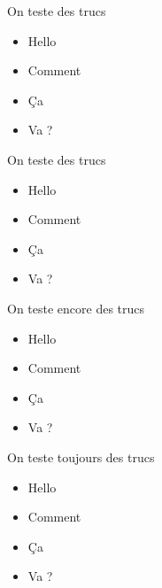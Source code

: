 \label{thermique}

\begin{frame}{On teste des trucs}
  \begin{itemize}
    \item<1->Hello
    \item<2->Comment
    \item<3->Ça
    \item<4->Va ?
  \end{itemize}
\end{frame}
\begin{frame}{On teste des trucs}
  \begin{itemize}
    \item<1->Hello
    \item<2->Comment
    \item<3->Ça
    \item<4->Va ?
  \end{itemize}
\end{frame}

\begin{frame}{On teste encore des trucs}
  \begin{itemize}
    \item<1->Hello
    \item<2->Comment
    \item<3->Ça
    \item<4->Va ?
  \end{itemize}
\end{frame}

\begin{frame}{On teste toujours des trucs}
  \begin{itemize}
    \item<1->Hello
    \item<2->Comment
    \item<3->Ça
    \item<4->Va ?
  \end{itemize}
\end{frame}
